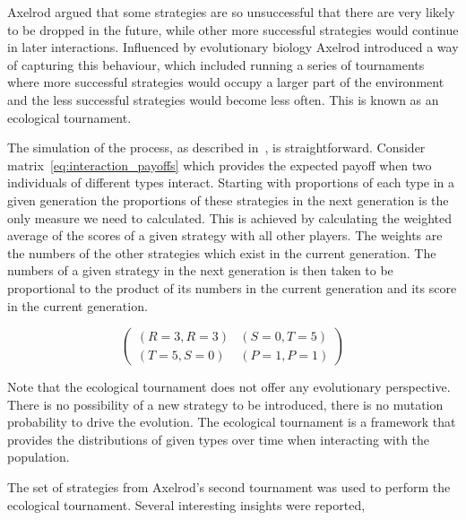 \documentclass{article}
\theoremstyle{definition}
\begin{document}
Axelrod argued that some strategies are so unsuccessful that there are very likely
to be dropped in the future, while other more successful strategies would continue
in later interactions. Influenced by evolutionary biology Axelrod introduced a way
of capturing this behaviour, which included running a series of tournaments where
more successful strategies would occupy a larger part of the environment and the
less successful strategies would become less often. This is known as an ecological
tournament.

The simulation of the process, as described in~\cite{Axelrod1984}, is straightforward.
Consider matrix~\ref{eq:interaction_payoffs} which provides the expected payoff
when two individuals of different types interact. Starting with proportions of
each type in a given generation the proportions of these strategies in the next
generation is the only measure we need to calculated. This is achieved by
calculating the weighted average of the scores of a given strategy with all
other players. The weights are the numbers of the other strategies which
exist in the current generation. The numbers of a given strategy in the next
generation is then taken to be proportional to the product of its numbers in the
current generation and its score in the current generation.

\begin{equation} \label{eq:interaction_payoffs}
    \begin{pmatrix}
    (R=3, R=3) & (S=0, T=5) \\ (T=5, S=0) & (P=1, P=1)
    \end{pmatrix}
\end{equation}

Note that the ecological tournament does not offer any evolutionary perspective.
There is no possibility of a new strategy to be introduced, there is no mutation
probability to drive the evolution. The ecological tournament is a framework that provides
the distributions of given types over time when interacting with the population.

The set of strategies from Axelrod's second tournament was used to perform the
ecological tournament. Several interesting insights were reported,
\end{document}
